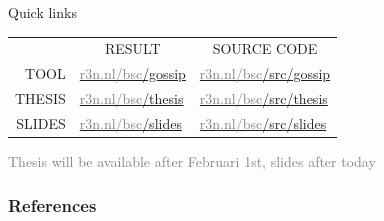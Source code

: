 \documentclass[aspectratio=169]{beamer}
\begin{document}
\begin{frame}[c]{Quick links}
    \begin{center}
        \begin{tabular}{rll}
                                    & \multicolumn{1}{c}{\scriptsize RESULT}                                & \multicolumn{1}{c}{\scriptsize SOURCE CODE}\vspace{5pt}\\
            {\scriptsize TOOL}      & \href{https://r3n.nl/bsc/gossip}{\textcolor{gray}{r3n.nl/bsc}/gossip} & \href{https://r3n.nl/bsc/src/gossip}{\textcolor{gray}{r3n.nl/bsc}/src/gossip}\vspace{5pt}\\
            {\scriptsize THESIS}    & \href{https://r3n.nl/bsc/thesis}{\textcolor{gray}{r3n.nl/bsc}/thesis} & \href{https://r3n.nl/bsc/src/thesis}{\textcolor{gray}{r3n.nl/bsc}/src/thesis}\vspace{5pt}\\
            {\scriptsize SLIDES}    & \href{https://r3n.nl/bsc/slides}{\textcolor{gray}{r3n.nl/bsc}/slides} & \href{https://r3n.nl/bsc/src/slides}{\textcolor{gray}{r3n.nl/bsc}/src/slides}
         \end{tabular}
          
         \bigskip
          
         \textcolor{gray}{\tiny Thesis will be available after Februari 1st, slides after today}
    \end{center}
\end{frame}
\begin{frame}[t,allowframebreaks]
    \frametitle{References}
    \printbibliography
\end{frame}
\end{document}
